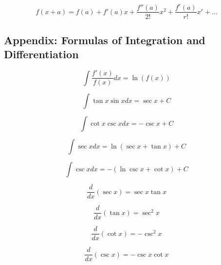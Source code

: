 \documentclass[a4paper,9pt]{scrartcl}
\begin{document}
    \begin{displaymath}
        f(x + a) = f(a) + f'(a)x + \frac{f''(a)}{2!}x^2 + \frac{f^{r}(a)}{r!}x^r + \dots
    \end{displaymath}

    \subsection{Appendix: Formulas of Integration and Differentiation}

    \begin{displaymath}
        \int \frac{f'(x)}{f(x)} dx = \ln(f(x))
    \end{displaymath}

    \begin{displaymath}
        \int{\tan{x}\sin{x}}dx = \sec{x} + C
    \end{displaymath}

    \begin{displaymath}
        \int{\cot{x}\csc{x}}dx = -\csc{x} + C
    \end{displaymath}

    \begin{displaymath}
        \int{\sec{x}}dx = \ln{(\sec{x} + \tan{x})} + C
    \end{displaymath}

    \begin{displaymath}
        \int{\csc{x}}dx = -(\ln{\csc{x} + \cot{x}}) + C
    \end{displaymath}

    \begin{displaymath}
        \frac{d}{dx}(\sec{x}) = \sec{x}\tan{x}
    \end{displaymath}

    \begin{displaymath}
        \frac{d}{dx}(\tan{x}) = \sec^2{x}
    \end{displaymath}

    \begin{displaymath}
        \frac{d}{dx}(\cot{x}) = -\csc^2{x}
    \end{displaymath}

    \begin{displaymath}
        \frac{d}{dx}(\csc{x}) = -\csc{x}\cot{x}
    \end{displaymath}
\end{document}
